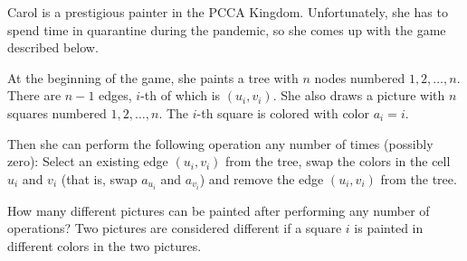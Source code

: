 Carol is a prestigious painter in the PCCA Kingdom.
Unfortunately, she has to spend time in quarantine during the pandemic, so she comes up with the game described below.

At the beginning of the game, she paints a tree with $n$ nodes numbered $1,2,\ldots,n$.
There are $n-1$ edges, $i$-th of which is $(u_i,v_i)$.
She also draws a picture with $n$ squares numbered $1,2,\ldots,n$.
The $i$-th square is colored with color $a_i = i$.

Then she can perform the following operation any number of times (possibly zero):
Select an existing edge $(u_i,v_i)$ from the tree, swap the colors in the cell $u_i$ and $v_i$ (that is, swap $a_{u_i}$ and $a_{v_i}$) and remove the edge $(u_i,v_i)$ from the tree.

How many different pictures can be painted after performing any number of operations?
Two pictures are considered different if a square $i$ is painted in different colors in the two pictures.